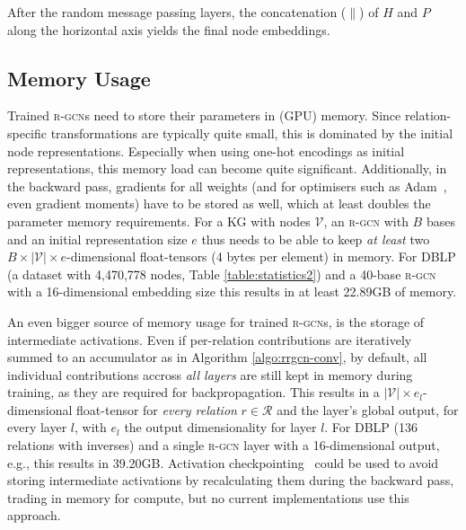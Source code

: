 \documentclass{llncs}
\begin{document}
After the random message passing layers, the concatenation ($\|$) of $H$ and $P$ along the horizontal axis yields the final node embeddings.

\subsection{Memory Usage}
Trained \textsc{r-gcn}s need to store their parameters in (GPU) memory. Since relation-specific transformations are typically quite small, this is dominated by the initial node representations. Especially when using one-hot encodings as initial representations, this memory load can become quite significant.
Additionally, in the backward pass, gradients for all weights (and for optimisers such as Adam~\cite{kingma2014method}, even gradient moments) have to be stored as well, which at least doubles the parameter memory requirements.
For a KG with nodes $\mathcal{V}$, an \textsc{r-gcn} with $B$ bases and an initial representation size $e$ thus needs to be able to keep \textit{at least} two $B \times |\mathcal{V}| \times e$-dimensional float-tensors (4 bytes per element) in memory. For DBLP (a dataset with 4,470,778 nodes, Table \ref{table:statistics2}) and a 40-base \textsc{r-gcn} with a 16-dimensional embedding size this results in at least 22.89GB of memory.

An even bigger source of memory usage for trained \textsc{r-gcn}s, is the storage of intermediate activations. Even if per-relation contributions are iteratively summed to an accumulator as in Algorithm \ref{algo:rrgcn-conv}, by default, all individual contributions accross \textit{all layers} are still kept in memory during training, as they are required for backpropagation. This results in a $|\mathcal{V}| \times e_l$-dimensional float-tensor for \textit{every relation} $r \in \mathcal{R}$ and the layer's global output, for every layer $l$, with $e_l$ the output dimensionality for layer $l$. For DBLP (136 relations with inverses) and a single \textsc{r-gcn} layer with a 16-dimensional output, e.g., this results in 39.20GB. Activation checkpointing~\cite{chen2016training} could be used to avoid storing intermediate activations by recalculating them during the backward pass, trading in memory for compute, but no current implementations use this approach.
\end{document}
